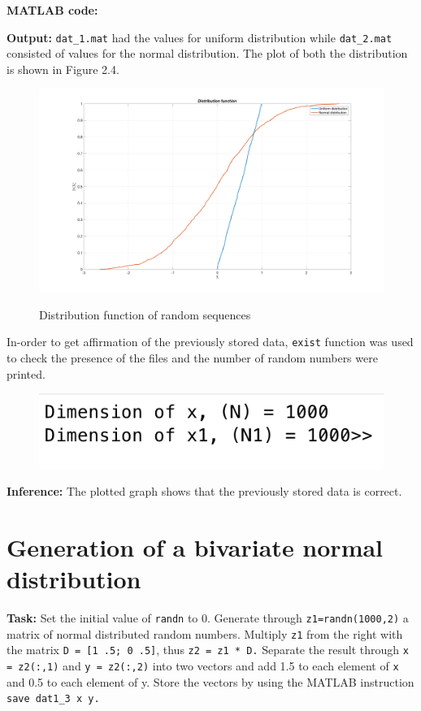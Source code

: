 \noindent \textbf{MATLAB code:}



\noindent \textbf{Output:}
\noindent \texttt{dat\_1.mat} had the values for uniform distribution while \texttt{dat\_2.mat} consisted of values for the normal distribution. The plot of both the distribution is shown in Figure 2.4.
\begin{figure}[H]
\centering
{\includegraphics[scale=0.13]{ass3_1.png}}
\caption{Distribution function of random sequences}
\label{Distribution function of random sequences}
\end{figure}

\noindent In-order to get affirmation of the previously stored data, \texttt{exist} function was used to check the presence of the files and the number of random numbers were printed.
\begin{figure}[H]
\centering
{\includegraphics[scale=0.68]{ass3_2.png}}
\end{figure}

\noindent \textbf{Inference:} The plotted graph shows that the previously stored data is correct.




\section{ Generation of a bivariate normal distribution  } \label{ Generation of a bivariate normal distribution  }
\noindent \textbf{Task:} Set the initial value of \texttt{randn} to 0. Generate through \texttt{z1=randn(1000,2)} a matrix of normal distributed random numbers. Multiply \texttt{z1} from the right with the matrix \texttt{D = [1 .5; 0 .5]}, thus \texttt{z2 = z1 * D.} Separate the result through \texttt{x = z2(:,1)} and \texttt{y = z2(:,2)} into two vectors and add 1.5 to each element of \texttt{x} and 0.5 to each element of y. Store the vectors by using the MATLAB instruction \texttt{save dat1\_3 x y.}


